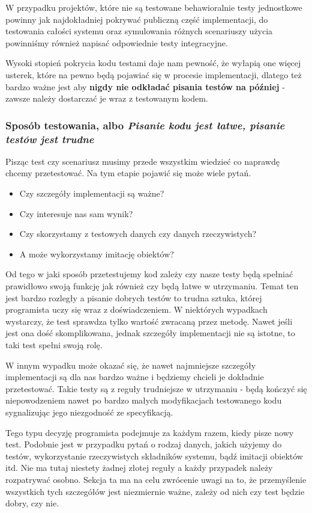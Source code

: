   W przypadku projektów, które nie są testowane behawioralnie testy jednostkowe powinny jak najdokładniej pokrywać publiczną część implementacji, do testowania całości systemu oraz symulowania różnych scenariuszy użycia powinniśmy również napisać odpowiednie testy integracyjne.
  
  Wysoki stopień pokrycia kodu testami daje nam pewność, że wyłapią one więcej usterek, które na pewno będą pojawiać się w procesie implementacji, dlatego też bardzo ważne jest aby \textbf{nigdy nie odkładać pisania testów na później} - zawsze należy dostarczać je wraz z testowanym kodem.
  
  \subsubsection{Sposób testowania, albo \emph{Pisanie kodu jest łatwe, pisanie testów jest trudne}}
  Pisząc test czy scenariusz musimy przede wszystkim wiedzieć co naprawdę chcemy przetestować. Na tym etapie pojawić się może wiele pytań.
  \begin{itemize}
    \item Czy szczegóły implementacji są ważne? 
    \item Czy interesuje nas sam wynik? 
    \item Czy skorzystamy z testowych danych czy danych rzeczywistych? 
    \item A może wykorzystamy imitację obiektów?
  \end{itemize}
  
  Od tego w jaki sposób przetestujemy kod zależy czy nasze testy będą spełniać prawidłowo swoją funkcję jak również czy będą łatwe w utrzymaniu. Temat ten jest bardzo rozległy a pisanie dobrych testów to trudna sztuka, której programista uczy się wraz z doświadczeniem. W niektórych wypadkach wystarczy, że test sprawdza tylko wartość zwracaną przez metodę. Nawet jeśli jest ona dość skomplikowana, jednak szczegóły implementacji nie są istotne, to taki test spełni swoją rolę. 
  
  W innym wypadku może okazać się, że nawet najmniejsze szczegóły implementacji są dla nas bardzo ważne i będziemy chcieli je dokładnie przetestować. Takie testy są z reguły trudniejsze w utrzymaniu - będą kończyć się niepowodzeniem nawet po bardzo małych modyfikacjach testowanego kodu sygnalizując jego niezgodność ze specyfikacją.
  
  Tego typu decyzję programista podejmuje za każdym razem, kiedy pisze nowy test. Podobnie jest w przypadku pytań o rodzaj danych, jakich użyjemy do testów, wykorzystanie rzeczywistych składników systemu, bądź imitacji obiektów itd. Nie ma tutaj niestety żadnej złotej reguły a każdy przypadek należy rozpatrywać osobno. Sekcja ta ma na celu zwrócenie uwagi na to, że przemyślenie wszystkich tych szczegółów jest niezmiernie ważne, zależy od nich czy test będzie dobry, czy nie.
  
